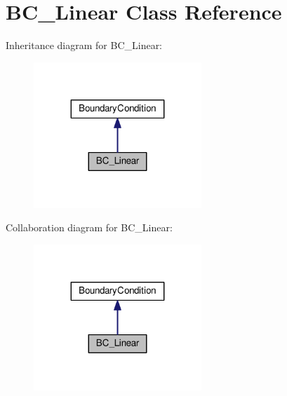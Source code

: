 \hypertarget{classBC__Linear}{}\section{B\+C\+\_\+\+Linear Class Reference}
\label{classBC__Linear}


Inheritance diagram for B\+C\+\_\+\+Linear\+:
\nopagebreak
\begin{figure}[H]
\begin{center}
\leavevmode
\includegraphics[width=179pt]{classBC__Linear__inherit__graph}
\end{center}
\end{figure}


Collaboration diagram for B\+C\+\_\+\+Linear\+:
\nopagebreak
\begin{figure}[H]
\begin{center}
\leavevmode
\includegraphics[width=179pt]{classBC__Linear__coll__graph}
\end{center}
\end{figure}
